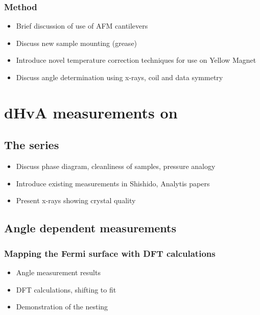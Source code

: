 \documentclass[11pt, a4paper]{article}
\begin{document}
        \subsubsection{Method}
        \begin{itemize}
            \item Brief discussion of use of AFM cantilevers
            \item Discuss new sample mounting (grease)
            \item Introduce novel temperature correction techniques for use on Yellow Magnet
            \item Discuss angle determination using x-rays, coil and data symmetry
        \end{itemize}


\section{dHvA measurements on \BaFeP}

    \subsection{The \BaFePAs series}
        \begin{itemize}
            \item Discuss phase diagram, cleanliness of samples, pressure analogy
            \item Introduce existing measurements in Shishido, Analytis papers
            \item Present x-rays showing crystal quality
        \end{itemize}

    \subsection{Angle dependent measurements}
        \subsubsection{Mapping the Fermi surface with DFT calculations}
            \begin{itemize}
                \item Angle measurement results
                \item DFT calculations, shifting to fit
                \item Demonstration of the nesting 
            \end{itemize}
\end{document}
